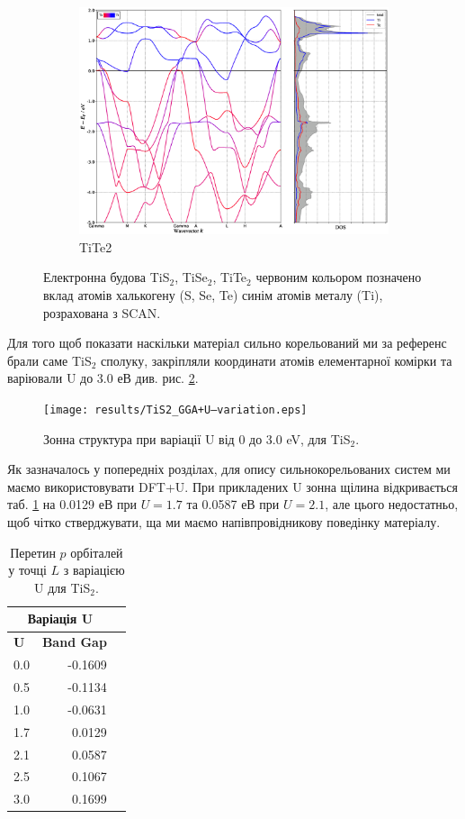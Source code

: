 \begin{figure}[H]
\begin{subfigure}[b]{.4\textwidth}
    	\includegraphics[width=\linewidth]{img/results/TiTe2_SCAN_relaxed_BAND+DOS}
    	\caption{
    	TiTe2}
	\end{subfigure}
\caption{Електронна будова TiS$_2$, TiSe$_2$, TiTe$_2$ червоним кольором позначено вклад атомів халькогену (S, Se, Te) синім атомів металу (Ti), розрахована з SCAN.}
\label{fig:bandstructireSCAN}
\end{figure}

Для того щоб показати наскільки матеріал сильно корельований ми за референс брали саме TiS$_2$ сполуку, закріпляли координати атомів елементарної комірки та варіювали U до 3.0 еВ див. рис. \ref{fig:variationU_GGA}. 

\begin{figure}
	\texttt{[image: results/TiS2\_GGA+U--variation.eps]}
	\caption{Зонна структура при варіації U від 0 до 3.0 eV, для TiS$_2$.}
	\label{fig:variationU_GGA}
\end{figure}

Як зазначалось у попередніх розділах, для опису сильнокорельованих систем ми маємо використовувати DFT+U. При прикладених U зонна щілина відкривається таб. \ref{tab:VariationU} на 0.0129 еВ при $U=1.7$ та 0.0587 еВ при $U=2.1$, але цього недостатньо, щоб чітко стверджувати, ща ми маємо напівпровідникову поведінку матеріалу. 

\begin{table}[H]\centering
\scriptsize
\begin{tabular}{lrr}\toprule
\multicolumn{2}{c}{\textbf{Варіація U }} \\\midrule
\multirow{2}{*}{\textbf{U}} &\multirow{2}{*}{\textbf{Band Gap}} \\
& \\
0.0 & -0.1609 \\
0.5 &-0.1134 \\
1.0 &-0.0631 \\
1.7 &0.0129 \\
2.1 &0.0587 \\
2.5 &0.1067 \\
3.0 &0.1699 \\
\bottomrule
\end{tabular}
\caption{Перетин $p$ орбіталей у точці $L$ з варіацією U для TiS$_2$.}\label{tab:VariationU}
\end{table}

